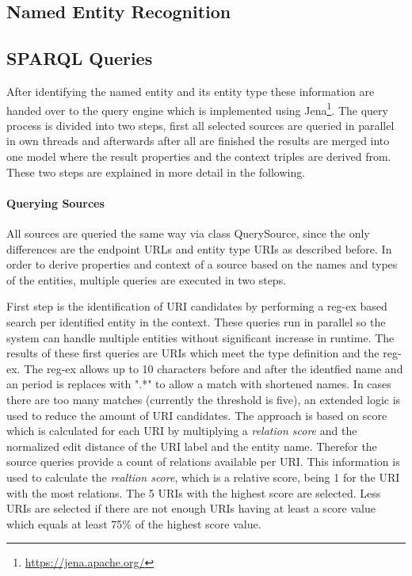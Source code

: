 \documentclass[11pt,titlepage,oneside,openany]{article}
\begin{document}
\subsection{Named Entity Recognition}

\subsection{SPARQL Queries}
After identifying the named entity and its entity type these information are handed over to the query engine which is implemented using Jena\footnote{\url{https://jena.apache.org/}}. The query process is divided into two steps, first all selected sources are queried in parallel in own threads and afterwards after all are finished the results are merged into one model where the result properties and the context triples are derived from. These two steps are explained in more detail in the following.
\paragraph{Querying Sources}
All sources are queried the same way via class QuerySource, since the only differences are the endpoint URLs and entity type URIs as described before. In order to derive properties and context of a source based on the names and types of the entities, multiple queries are executed in two steps.

First step is the identification of URI candidates by performing a reg-ex based search per identified entity in the context. These queries run in parallel so the system can handle multiple entities without significant increase in runtime. The results of these first queries are URIs which meet the type definition and the reg-ex. The reg-ex allows up to 10 characters before and after the identfied name and an period is replaces with ".*" to allow a match with shortened names. In cases there are too many matches (currently the threshold is five), an extended logic is used to reduce the amount of URI candidates. 
The approach is based on score which is calculated for each URI by multiplying a \textit{relation score} and the normalized edit distance of the URI label and the entity name. Therefor the source queries provide a count of relations available per URI. This information is used to calculate the \textit{realtion score}, which is a relative score, being 1 for the URI with the most relations. The 5 URIs with the highest score are selected. Less URIs are selected if there are not enough URIs having at least a score value which equals at least 75\% of the highest score value.
\end{document}
